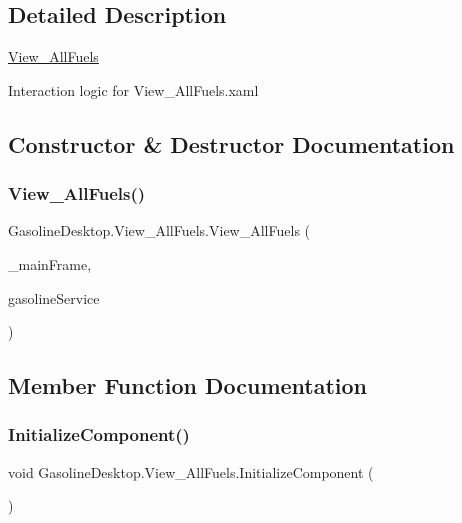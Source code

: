 \subsection{Detailed Description}
\mbox{\hyperlink{class_gasoline_desktop_1_1_view___all_fuels}{View\+\_\+\+All\+Fuels}} 

Interaction logic for View\+\_\+\+All\+Fuels.\+xaml

\subsection{Constructor \& Destructor Documentation}
\mbox{\label{class_gasoline_desktop_1_1_view___all_fuels_aa2d01afa055940de56665cce196260d5}} 
\subsubsection{\texorpdfstring{View\_AllFuels()}{View\_AllFuels()}}
{\footnotesize\ttfamily Gasoline\+Desktop.\+View\+\_\+\+All\+Fuels.\+View\+\_\+\+All\+Fuels (\begin{DoxyParamCaption}\item[{Frame}]{\+\_\+main\+Frame,  }\item[{\mbox{\hyperlink{class_gasoline_desktop_1_1_gasoline_service}{Gasoline\+Service}}}]{gasoline\+Service }\end{DoxyParamCaption})}



\subsection{Member Function Documentation}
\mbox{\label{class_gasoline_desktop_1_1_view___all_fuels_a5b5ef4ae6f2ee05ce8ec6b8af1ba331f}} 
\subsubsection{\texorpdfstring{InitializeComponent()}{InitializeComponent()}\hspace{0.1cm}{\footnotesize\ttfamily [1/3]}}
{\footnotesize\ttfamily void Gasoline\+Desktop.\+View\+\_\+\+All\+Fuels.\+Initialize\+Component (\begin{DoxyParamCaption}{ }\end{DoxyParamCaption})}



